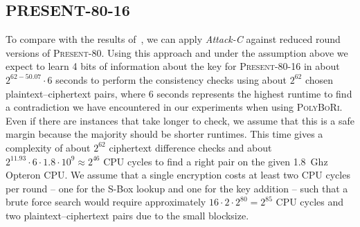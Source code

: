\documentclass{llncs}
\newcommand{\PRESENT}{\textsc{Present}\xspace}
\begin{document}
\subsection{PRESENT-80-16}
To compare with the results of~\cite{present-dc:africacrypt}, we can apply \emph{Attack-C}
against reduced round versions of \PRESENT-80. Using this approach and under
the assumption above we expect to
learn 4 bits of information about the key for \PRESENT-80-16 in about
$2^{62-50.07} \cdot 6$ seconds to perform the consistency
checks using about $2^{62}$ chosen plaintext--ciphertext pairs,
where $6$ seconds represents the highest runtime to find a contradiction we have
encountered in our experiments when using \textsc{PolyBoRi}. Even if there are
instances that take longer to check, we assume that this is a safe
margin because the majority should be shorter runtimes. This time
gives a complexity of about $2^{62}$ ciphertext
difference checks and about $2^{11.93} \cdot 6 \cdot 1.8
\cdot 10^9 \approx 2^{46}$ CPU cycles to find a right pair on the given 1.8~Ghz
Opteron CPU. We assume that a single encryption costs at least two CPU cycles
per round -- one for the S-Box lookup and one for the key addition -- such that
a brute force search would require approximately $16 \cdot 2 \cdot 2^{80} =
2^{85}$ CPU cycles and two plaintext--ciphertext pairs due to the small
blocksize.
\end{document}
